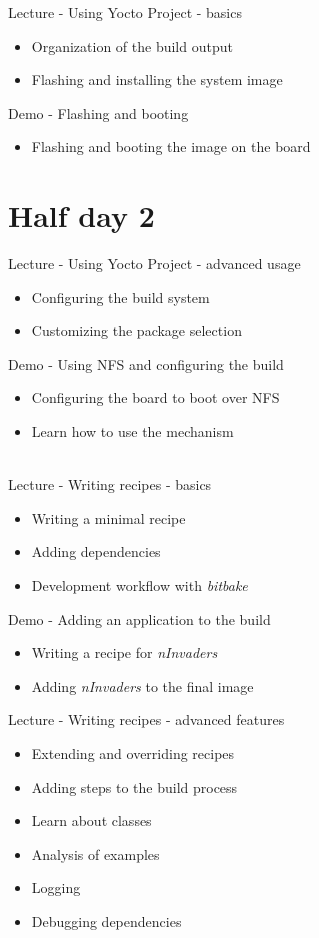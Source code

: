 \documentclass[a4paper,12pt,obeyspaces,spaces,hyphens]{article}
\begin{document}
\newpage
\feagendaonecolumn
{Lecture - Using Yocto Project - basics}
{
  \begin{itemize}
  \item Organization of the build output
  \item Flashing and installing the system image
  \end{itemize}
}

\feagendaonecolumn
{Demo - Flashing and booting}
{
  \begin{itemize}
  \item Flashing and booting the image on the board
  \end{itemize}
}

\section{Half day 2}

\feagendatwocolumn
{Lecture - Using Yocto Project - advanced usage}
{
  \begin{itemize}
  \item Configuring the build system
  \item Customizing the package selection
  \end{itemize}
}
{Demo - Using NFS and configuring the build}
{
  \begin{itemize}
  \item Configuring the board to boot over NFS
  \item Learn how to use the  mechanism
  \end{itemize}
}
\\

\feagendatwocolumn
{Lecture - Writing recipes - basics}
{
  \begin{itemize}
  \item Writing a minimal recipe
  \item Adding dependencies
  \item Development workflow with {\em bitbake}
  \end{itemize}
}
{Demo - Adding an application to the build}
{
  \begin{itemize}
  \item Writing a recipe for {\em nInvaders}
  \item Adding {\em nInvaders} to the final image
  \end{itemize}
}

\feagendaonecolumn
{Lecture - Writing recipes - advanced features}
{
  \begin{itemize}
  \item Extending and overriding recipes
  \item Adding steps to the build process
  \item Learn about classes
  \item Analysis of examples
  \item Logging
  \item Debugging dependencies
  \end{itemize}
}
\end{document}
